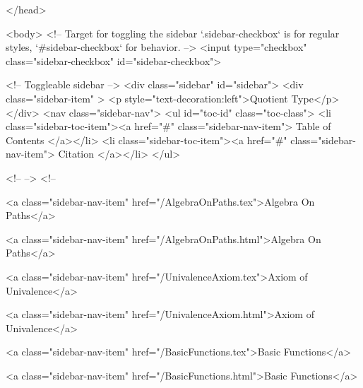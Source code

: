   
</head>




  <body>
    <!-- Target for toggling the sidebar `.sidebar-checkbox` is for regular
     styles, `#sidebar-checkbox` for behavior. -->
<input type="checkbox" class="sidebar-checkbox" id="sidebar-checkbox">

<!-- Toggleable sidebar -->
<div class="sidebar" id="sidebar">
  <div class="sidebar-item" >
    <p style="text-decoration:left">Quotient Type</p>
  </div>
  <nav class="sidebar-nav">
    <ul id="toc-id" class="toc-class">
  <li class="sidebar-toc-item"><a href="#" class="sidebar-nav-item"> Table of Contents </a></li>
  <li class="sidebar-toc-item"><a href="#" class="sidebar-nav-item"> Citation </a></li>
</ul>


    <!--  -->
    <!-- 
      
    
      
    
      
    
      
        
      
    
      
        
          <a class="sidebar-nav-item" href="/AlgebraOnPaths.tex">Algebra On Paths</a>
        
      
    
      
        
          <a class="sidebar-nav-item" href="/AlgebraOnPaths.html">Algebra On Paths</a>
        
      
    
      
        
          <a class="sidebar-nav-item" href="/UnivalenceAxiom.tex">Axiom of Univalence</a>
        
      
    
      
        
          <a class="sidebar-nav-item" href="/UnivalenceAxiom.html">Axiom of Univalence</a>
        
      
    
      
        
          <a class="sidebar-nav-item" href="/BasicFunctions.tex">Basic Functions</a>
        
      
    
      
        
          <a class="sidebar-nav-item" href="/BasicFunctions.html">Basic Functions</a>
        
      
    
      
        
